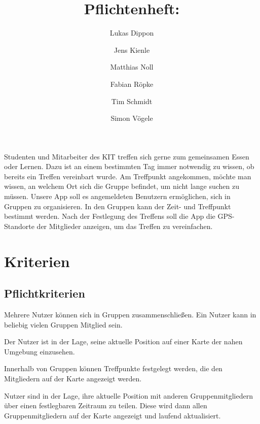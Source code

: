 \documentclass[parskip=full,11pt]{scrartcl}
\title{Pflichtenheft: \producttitle}
\author{Lukas Dippon
        \and Jens Kienle
        \and Matthias Noll
        \and Fabian Röpke
        \and Tim Schmidt
        \and Simon Vögele}
\begin{document}
\maketitle
\thispagestyle{empty} %

\section*{} %
Studenten und Mitarbeiter des KIT treffen sich gerne zum gemeinsamen Essen oder Lernen.
Dazu ist an einem bestimmten Tag immer notwendig zu wissen, ob bereits ein Treffen vereinbart wurde.
Am Treffpunkt angekommen, möchte man wissen, an welchem Ort sich die Gruppe befindet, um nicht lange suchen zu müssen.
Unsere App soll es angemeldeten Benutzern ermöglichen, sich in Gruppen zu organisieren.
In den Gruppen kann der Zeit- und Treffpunkt bestimmt werden.
Nach der Festlegung des Treffens soll die App die GPS-Standorte der Mitglieder anzeigen, um das Treffen zu vereinfachen.

\pagebreak
\tableofcontents

\pagebreak
\section{Kriterien}

\subsection{Pflichtkriterien}
Mehrere Nutzer können sich in Gruppen zusammenschließen.
Ein Nutzer kann in beliebig vielen Gruppen Mitglied sein.

Der Nutzer ist in der Lage, seine aktuelle Position auf einer Karte der nahen
Umgebung einzusehen.

Innerhalb von Gruppen können Treffpunkte festgelegt werden,
die den Mitgliedern auf der Karte angezeigt werden.

Nutzer sind in der Lage, ihre aktuelle Position mit anderen Gruppenmitgliedern
über einen festlegbaren Zeitraum zu teilen.
Diese wird dann allen Gruppenmitgliedern auf der Karte angezeigt und laufend
aktualisiert.
\end{document}
